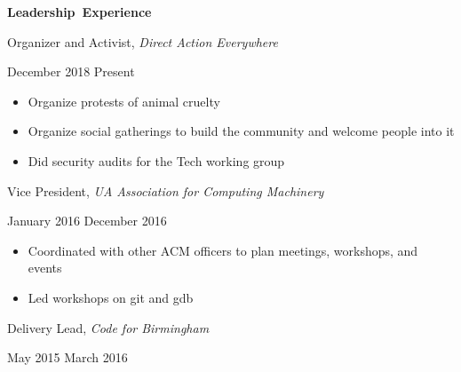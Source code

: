 \documentclass[11pt]{article}
\begin{document}
\vspace{0.8em}
\hbox{\large \textbf{Leadership Experience}}

\vspace{0.4em}
\begin{minipage}[t]{0.65\textwidth}
\flushleft
Organizer and Activist, \textit{Direct Action Everywhere}\\
\end{minipage}
\begin{minipage}[t]{0.30\textwidth}
\flushright
December 2018 \space \textemdash \space Present\\
\end{minipage}

\begin{itemize}
  \item Organize protests of animal cruelty
  \item Organize social gatherings to build the community and welcome people into it
  \item Did security audits for the Tech working group
\end{itemize}

\vspace{0.4em}
\begin{minipage}[t]{0.65\textwidth}
\flushleft
Vice President, \textit{UA Association for Computing Machinery}\\
\end{minipage}
\begin{minipage}[t]{0.30\textwidth}
\flushright
January 2016 \space \textemdash \space December 2016\\
\end{minipage}

\begin{itemize}
  \item Coordinated with other ACM officers to plan meetings, workshops, and events
  \item Led workshops on git and gdb
\end{itemize}

\vspace{0.4em}
\begin{minipage}[t]{0.65\textwidth}
\flushleft
Delivery Lead, \textit{Code for Birmingham}\\
\end{minipage}
\begin{minipage}[t]{0.30\textwidth}
\flushright
May 2015 \space \textemdash \space March 2016\\
\end{minipage}
\end{document}
